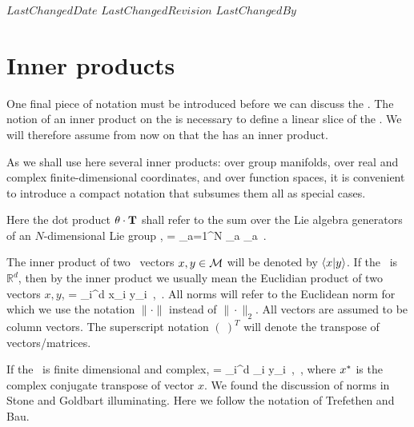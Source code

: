 \ifsvnmulti
	{$LastChangedDate$}
	{$LastChangedRevision$} {$LastChangedBy$}
\fi

\section{Inner products}
\label{def:innerProduct}

One final piece of notation must be introduced before we can discuss
the \mslices. The notion of an inner product on the {\statesp} is
necessary to define a linear slice of the {\statesp}. We will
therefore assume from now on that the {\statesp} has an inner product.

As we shall use here several inner products:
over group manifolds, over real and complex finite-dimensional
coordinates, and over function spaces, it is convenient to introduce a
compact notation that subsumes them all as special cases.

Here the dot product ${\bf \theta} \cdot \mathbf{T}$ shall refer to the sum over
the Lie algebra generators of an $N$-dimensional Lie group \Group,
\beq
\gSpace \cdot \Lg = \sum_{a=1}^N \gSpace_a \Lg_a
\,.

The inner product of two \statesp\ vectors $x, y \in {\cal M}$ will be denoted
by $\braket{x}{y}$. If the \statesp\ is $\mathbb{R}^d$, then by the inner
product we usually mean the Euclidian product of two vectors $x,y$,
\beq
{} = \sum_i^d {x}_i y_i
    \,,\qquad \pS \subset \reals
\,.
All norms will refer to the Euclidean norm for which we use the notation
$\|\cdot\|$ instead of  $\|\cdot\|_2$. All vectors are assumed to be
column vectors. The superscript notation $(~)^T$ will denote the
transpose of vectors/matrices.

If the \statesp\ is finite dimensional and complex,
\beq
{} = \sum_i^d _i y_i
    \,,\qquad \pS \subset \complex
\,,
where ${x}^*$ is the complex conjugate transpose of vector $x$.
We found the discussion of norms in Stone and Goldbart
illuminating.
Here we follow the notation of Trefethen and Bau.

